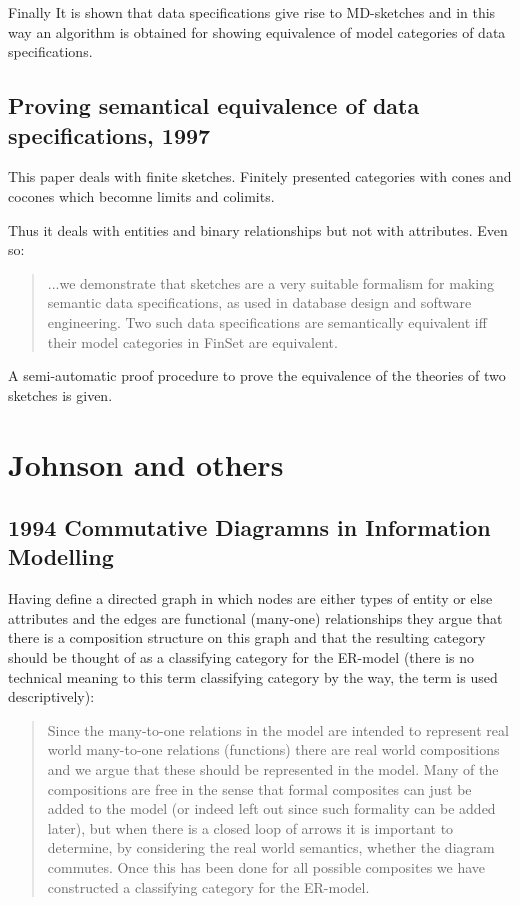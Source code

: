 \documentclass[10pt,a4paper]{scrartcl}
\newcommand{\displaybibentry}[1]
{\begin{framed}
\bibentry{#1}
\end{framed}
}
\begin{document}
Finally It is shown that data specifications give rise to MD-sketches and in this way an algorithm is obtained for showing equivalence of model categories of data specifications.


\subsection{Proving semantical equivalence of data specifications, 1997}

\displaybibentry{piessens1997}

This paper deals with finite sketches. Finitely presented categories with cones and cocones which becomne limits and colimits.

Thus it deals with entities and binary relationships but not with attributes. Even so:
\begin{quote}
...we demonstrate that sketches are a very suitable
formalism for making semantic data specifications, as used in database design and software
engineering. Two such data specifications are semantically equivalent iff their model categories in
FinSet are equivalent. 
\end{quote}

A semi-automatic proof
procedure to prove the equivalence of the theories of two sketches is given.



\section {Johnson and others}
\subsection{1994 Commutative Diagramns in Information Modelling} 
\displaybibentry{Johnson93}
Having define a directed graph in which nodes are either types of entity or
else attributes and the edges are functional (many-one) relationships
they argue that there is a composition structure on this graph
and that the resulting category should be thought of as a classifying category
for the ER-model (there is no technical meaning to this term classifying category by the way, 
the term is used descriptively):
\begin{quote}
Since the many-to-one relations in the
model are intended to represent real world many-to-one relations (functions)
there are real world compositions and we argue that these should be represented
in the model. Many of the compositions are free in the sense that formal 
composites can just be added to the model (or indeed left out since such formality
can be added later), but when there is a closed loop of arrows it is important to
determine, by considering the real world semantics, whether the diagram commutes. 
Once this has been done for all possible composites we have constructed
a classifying category for the ER-model.
\end{quote}
\end{document}
